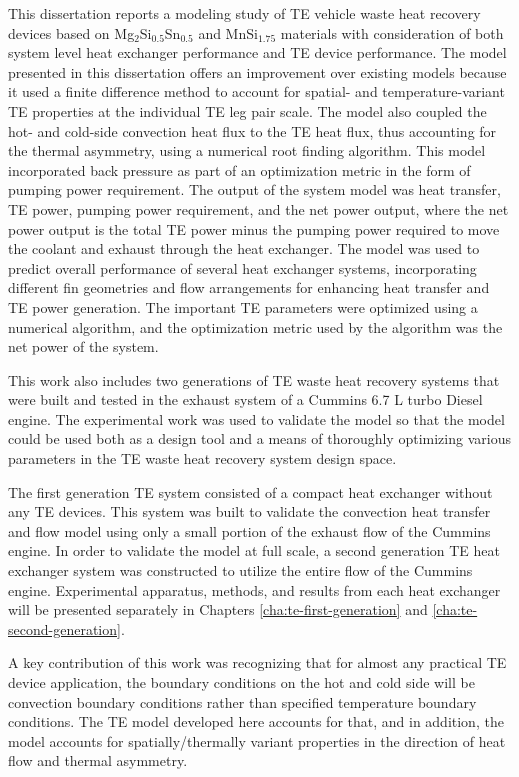 \documentclass[preprint,authoryear,12pt]{elsarticle}
\begin{document}
This dissertation reports a modeling study of TE vehicle waste heat
recovery devices based on Mg$_2$Si$_{0.5}$Sn$_{0.5}$ and MnSi$_{1.75}$
materials with consideration of both system level heat exchanger
performance and TE device performance.  The model presented in this
dissertation offers an improvement over existing models because it
used a finite difference method to account for spatial- and
temperature-variant TE properties at the individual TE leg pair
scale. The model also coupled the hot- and cold-side convection heat
flux to the TE heat flux, thus accounting for the thermal asymmetry,
using a numerical root finding algorithm.  This model incorporated
back pressure as part of an optimization metric in the form of pumping
power requirement.  The output of the system model was heat transfer,
TE power, pumping power requirement, and the net power output, where
the net power output is the total TE power minus the pumping power
required to move the coolant and exhaust through the heat
exchanger. The model was used to predict overall performance of
several heat exchanger systems, incorporating different fin geometries
and flow arrangements for enhancing heat transfer and TE power
generation.  The important TE parameters were optimized using a
numerical algorithm, and the optimization metric used by the algorithm
was the net power of the system.

This work also includes two generations of TE waste heat recovery
systems that were built and tested in the exhaust system of a Cummins
6.7 L turbo Diesel engine. The experimental work was used to validate
the model so that the model could be used both as a design tool and a
means of thoroughly optimizing various parameters in the TE waste heat
recovery system design space.

The first generation TE system consisted of a compact heat exchanger
without any TE devices.  This system was built to validate the
convection heat transfer and flow model using only a small portion of
the exhaust flow of the Cummins engine.  In order to validate the
model at full scale, a second generation TE heat exchanger system was
constructed to utilize the entire flow of the Cummins engine.
Experimental apparatus, methods, and results from each heat exchanger
will be presented separately in Chapters \ref{cha:te-first-generation}
and \ref{cha:te-second-generation}.  

A key contribution of this work was recognizing that for almost any
practical TE device application, the boundary conditions on the hot
and cold side will be convection boundary conditions rather than
specified temperature boundary conditions.  The TE model developed
here accounts for that, and in addition, the model accounts for
spatially/thermally variant properties in the direction of heat flow
and thermal asymmetry.
\end{document}
